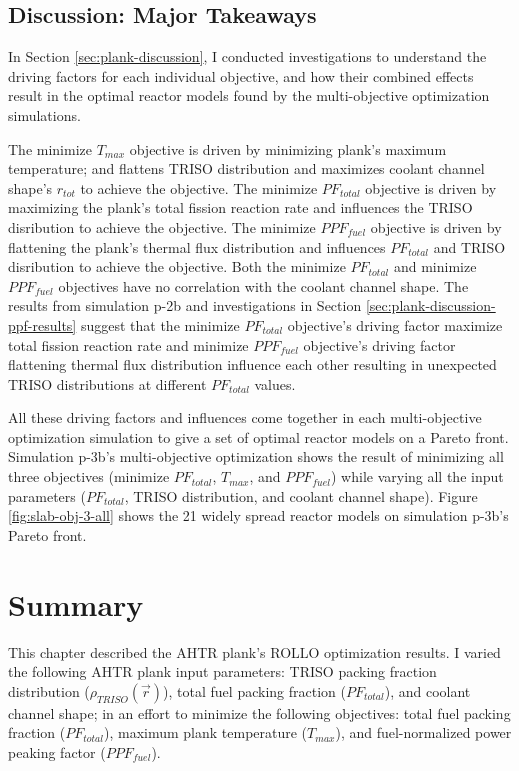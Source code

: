 \subsection{Discussion: Major Takeaways}
In Section \ref{sec:plank-discussion}, I conducted investigations to understand the 
driving factors for each individual objective, and how their combined effects 
result in the optimal reactor models found by the multi-objective optimization 
simulations. 

The minimize $T_{max}$ objective is driven by minimizing plank's maximum temperature; 
and flattens TRISO distribution and maximizes coolant channel shape's $r_{tot}$ to 
achieve the objective. 
The minimize $PF_{total}$ objective is driven by maximizing the plank's total fission 
reaction rate and influences the TRISO disribution to achieve the objective. 
The minimize $PPF_{fuel}$ objective is driven by flattening the plank's thermal flux
distribution and influences $PF_{total}$ and TRISO disribution to achieve the objective. 
Both the minimize $PF_{total}$ and minimize $PPF_{fuel}$ objectives have no correlation 
with the coolant channel shape. 
The results from simulation p-2b and investigations in Section 
\ref{sec:plank-discussion-ppf-results} suggest that the minimize $PF_{total}$ 
objective's driving factor maximize total fission reaction rate and 
minimize $PPF_{fuel}$ objective's driving factor flattening thermal flux distribution 
influence each other resulting in unexpected TRISO distributions at different 
$PF_{total}$ values. 

All these driving factors and influences come together in each multi-objective 
optimization simulation to give a set of optimal reactor models on a Pareto front. 
Simulation p-3b's multi-objective optimization shows the result of minimizing all 
three objectives (minimize $PF_{total}$, $T_{max}$, and $PPF_{fuel}$) while varying 
all the input parameters ($PF_{total}$, TRISO distribution, and coolant channel shape).
Figure \ref{fig:slab-obj-3-all} shows the 21 widely spread reactor models on simulation 
p-3b's Pareto front. 

\pagebreak
\section{Summary}
\glsresetall
This chapter described the \gls{AHTR} plank's \gls{ROLLO} optimization results. 
I varied the following \gls{AHTR} plank input parameters: \gls{TRISO} packing fraction 
distribution ($\rho_{TRISO}(\vec{r})$), total fuel packing fraction ($PF_{total}$), and 
coolant channel shape; in an effort to minimize the following objectives: total 
fuel packing fraction ($PF_{total}$), maximum plank temperature ($T_{max}$), and 
fuel-normalized power peaking factor ($PPF_{fuel}$). 


